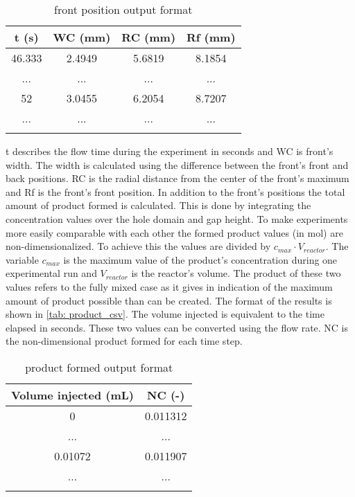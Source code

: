 \documentclass[../thesis.tex]{subfiles}
\begin{document}
\begin{table} [htb]
	\centering
	\caption{front position output format}
	\begin{tabular}{ cccc }
		\hline
		t (s) & WC (mm) & RC (mm) & Rf (mm) \\
		\hline
		46.333 & 2.4949 & 5.6819 & 8.1854 \\
		... & ... & ... & ... \\
		52 & 3.0455 & 6.2054 & 8.7207 \\
		... & ... & ... & ... \\
		\hline
		\label{tab: front_csv}
	\end{tabular}
\end{table}
t describes the flow time during the experiment in seconds and WC is front's width. The width is calculated using the difference between the front's front and back positions. RC is the radial distance from the center of the front's maximum and Rf is the front's front position.
In addition to the front's positions the total amount of product formed is calculated. This is done by integrating the concentration values over the hole domain and gap height. To make experiments more easily comparable with each other the formed product values (in mol) are non-dimensionalized. To achieve this the values are divided by $c_{max} \cdot V_{reactor}$. The variable $c_{max}$ is the maximum value of the product's concentration during one experimental run and $V_{reactor}$ is the reactor's volume. The product of these two values refers to the fully mixed case as it gives in indication of the maximum amount of product possible than can be created. The format of the results is shown in \autoref{tab: product_csv}. The volume injected is equivalent to the time elapsed in seconds. These two values can be converted using the flow rate. NC is the non-dimensional product formed for each time step.

\begin{table} [htb]
	\centering
	\caption{product formed output format}
	\begin{tabular}{ cc }
		\hline
		Volume injected (mL) & NC (-) \\
		\hline
		0 & 0.011312 \\
		... & ... \\
		0.01072 & 0.011907 \\
		... & ... \\
		\hline
		\label{tab: product_csv}
	\end{tabular}
\end{table}
\end{document}
